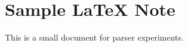 \documentclass{article}
\begin{document}
\section*{Sample LaTeX Note}
This is a small document for parser experiments.
\end{document}
